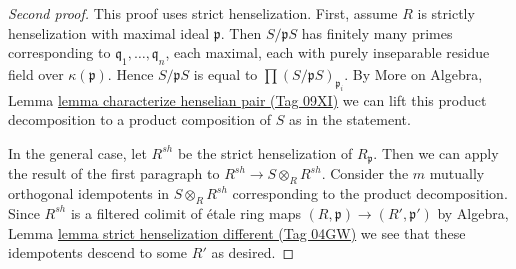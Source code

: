 \documentclass{amsart}
\theoremstyle{plain}
\theoremstyle{definition}
\theoremstyle{remark}
\numberwithin{equation}{subsection}
\begin{document}
\begin{proof}[Second proof]
This proof uses strict henselization. First, assume $R$ is strictly
henselization with maximal ideal $\mathfrak p$. Then $S/\mathfrak p S$
has finitely many primes corresponding to
$\mathfrak q_1, \ldots, \mathfrak q_n$, each maximal,
each with purely inseparable residue field over $\kappa(\mathfrak p)$.
Hence $S/\mathfrak p S$ is equal to $\prod (S/\mathfrak p S)_{\mathfrak p_i}$.
By More on Algebra, Lemma \href{https://stacks.math.columbia.edu/tag/09XI}{lemma characterize henselian pair (Tag 09XI)}
we can lift this product decomposition to a product composition of $S$
as in the statement.

\medskip\noindent
In the general case, let $R^{sh}$ be the strict henselization of
$R_\mathfrak p$. Then we can apply the result of the first paragraph
to $R^{sh} \to S \otimes_R R^{sh}$. Consider the $m$ mutually orthogonal
idempotents in $S \otimes_R R^{sh}$ corresponding to the product
decomposition. Since $R^{sh}$ is a filtered colimit of \'etale
ring maps $(R, \mathfrak p) \to (R', \mathfrak p')$ by
Algebra, Lemma \href{https://stacks.math.columbia.edu/tag/04GW}{lemma strict henselization different (Tag 04GW)}
we see that these idempotents descend to some $R'$ as desired.
\end{proof}
\end{document}
